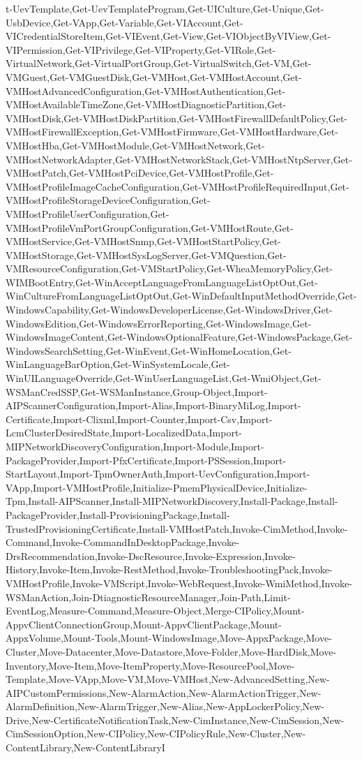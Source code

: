{{t-UevTemplate,Get-UevTemplateProgram,Get-UICulture,Get-Unique,Get-UsbDevice,Get-VApp,Get-Variable,Get-VIAccount,Get-VICredentialStoreItem,Get-VIEvent,Get-View,Get-VIObjectByVIView,Get-VIPermission,Get-VIPrivilege,Get-VIProperty,Get-VIRole,Get-VirtualNetwork,Get-VirtualPortGroup,Get-VirtualSwitch,Get-VM,Get-VMGuest,Get-VMGuestDisk,Get-VMHost,Get-VMHostAccount,Get-VMHostAdvancedConfiguration,Get-VMHostAuthentication,Get-VMHostAvailableTimeZone,Get-VMHostDiagnosticPartition,Get-VMHostDisk,Get-VMHostDiskPartition,Get-VMHostFirewallDefaultPolicy,Get-VMHostFirewallException,Get-VMHostFirmware,Get-VMHostHardware,Get-VMHostHba,Get-VMHostModule,Get-VMHostNetwork,Get-VMHostNetworkAdapter,Get-VMHostNetworkStack,Get-VMHostNtpServer,Get-VMHostPatch,Get-VMHostPciDevice,Get-VMHostProfile,Get-VMHostProfileImageCacheConfiguration,Get-VMHostProfileRequiredInput,Get-VMHostProfileStorageDeviceConfiguration,Get-VMHostProfileUserConfiguration,Get-VMHostProfileVmPortGroupConfiguration,Get-VMHostRoute,Get-VMHostService,Get-VMHostSnmp,Get-VMHostStartPolicy,Get-VMHostStorage,Get-VMHostSysLogServer,Get-VMQuestion,Get-VMResourceConfiguration,Get-VMStartPolicy,Get-WheaMemoryPolicy,Get-WIMBootEntry,Get-WinAcceptLanguageFromLanguageListOptOut,Get-WinCultureFromLanguageListOptOut,Get-WinDefaultInputMethodOverride,Get-WindowsCapability,Get-WindowsDeveloperLicense,Get-WindowsDriver,Get-WindowsEdition,Get-WindowsErrorReporting,Get-WindowsImage,Get-WindowsImageContent,Get-WindowsOptionalFeature,Get-WindowsPackage,Get-WindowsSearchSetting,Get-WinEvent,Get-WinHomeLocation,Get-WinLanguageBarOption,Get-WinSystemLocale,Get-WinUILanguageOverride,Get-WinUserLanguageList,Get-WmiObject,Get-WSManCredSSP,Get-WSManInstance,Group-Object,Import-AIPScannerConfiguration,Import-Alias,Import-BinaryMiLog,Import-Certificate,Import-Clixml,Import-Counter,Import-Csv,Import-LcmClusterDesiredState,Import-LocalizedData,Import-MIPNetworkDiscoveryConfiguration,Import-Module,Import-PackageProvider,Import-PfxCertificate,Import-PSSession,Import-StartLayout,Import-TpmOwnerAuth,Import-UevConfiguration,Import-VApp,Import-VMHostProfile,Initialize-PmemPhysicalDevice,Initialize-Tpm,Install-AIPScanner,Install-MIPNetworkDiscovery,Install-Package,Install-PackageProvider,Install-ProvisioningPackage,Install-TrustedProvisioningCertificate,Install-VMHostPatch,Invoke-CimMethod,Invoke-Command,Invoke-CommandInDesktopPackage,Invoke-DrsRecommendation,Invoke-DscResource,Invoke-Expression,Invoke-History,Invoke-Item,Invoke-RestMethod,Invoke-TroubleshootingPack,Invoke-VMHostProfile,Invoke-VMScript,Invoke-WebRequest,Invoke-WmiMethod,Invoke-WSManAction,Join-DtiagnosticResourceManager,Join-Path,Limit-EventLog,Measure-Command,Measure-Object,Merge-CIPolicy,Mount-AppvClientConnectionGroup,Mount-AppvClientPackage,Mount-AppxVolume,Mount-Tools,Mount-WindowsImage,Move-AppxPackage,Move-Cluster,Move-Datacenter,Move-Datastore,Move-Folder,Move-HardDisk,Move-Inventory,Move-Item,Move-ItemProperty,Move-ResourcePool,Move-Template,Move-VApp,Move-VM,Move-VMHost,New-AdvancedSetting,New-AIPCustomPermissions,New-AlarmAction,New-AlarmActionTrigger,New-AlarmDefinition,New-AlarmTrigger,New-Alias,New-AppLockerPolicy,New-Drive,New-CertificateNotificationTask,New-CimInstance,New-CimSession,New-CimSessionOption,New-CIPolicy,New-CIPolicyRule,New-Cluster,New-ContentLibrary,New-ContentLibraryI}}
